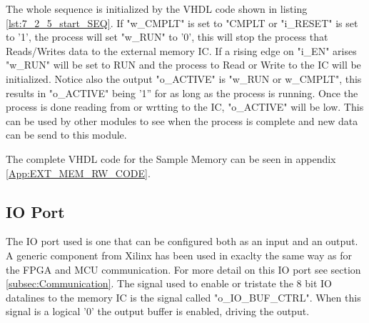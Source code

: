 The whole sequence is initialized by the VHDL code shown in listing \ref{lst:7_2_5_start_SEQ}. If "w\_CMPLT" is set to "CMPLT or "i\_RESET" is set to '1', the process will set "w\_RUN" to '0', this will stop the process that Reads/Writes data to the external memory IC. If a rising edge on "i\_EN" arises "w\_RUN" will be set to RUN and the process to Read or Write to the IC will be initialized. Notice also the output "o\_ACTIVE" is "w\_RUN or w\_CMPLT", this results in "o\_ACTIVE" being '1'' for as long as the process is running. Once the process is done reading from or wrtting to the IC, "o\_ACTIVE" will be low. This can be used by other modules to see when the process is complete and new data can be send to this module.

 

The complete VHDL code for the Sample Memory can be seen in appendix \ref{App:EXT_MEM_RW_CODE}.

\subsection*{IO Port}
The IO port used is one that can be configured both as an input and an output. A generic component from Xilinx has been used in exaclty the same way as for the FPGA and MCU communication. For more detail on this IO port see section \ref{subsec:Communication}. The signal used to enable or tristate the 8 bit IO datalines to the memory IC is the signal called "o\_IO\_BUF\_CTRL". When this signal is a logical '0' the output buffer is enabled, driving the output.